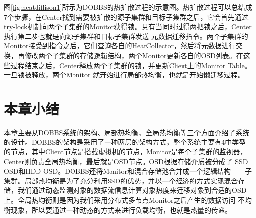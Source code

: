 图\ref{fig:heatdiffison1}所示为DOBBS的热扩散过程的示意图。热扩散过程可以总结成7个步骤，在Center找到需要被扩散的源子集群和目标子集群之后，它会首先通过try-lock机制向两个子集群的Monitor获得锁。只有当同时过得两把锁之后，Center执行第二步也就是向源子集群和目标子集群发送
元数据迁移指令。两个子集群的Monitor接受到指令之后，它们查询各自的HeatCollector，然后将元数据进行交换，再修改两个子集群的存储逻辑结构，两个Monitor更新各自的OSD列表。在这些过程结束之后，Center释放两个子集群的锁，并更新Client上的Monitor Table。一旦锁被释放，两个Monitor
就开始进行局部热均衡，也就是开始懒迁移过程。

\section{本章小结}
本章主要从DOBBS系统的架构、局部热均衡、全局热均衡等三个方面介绍了系统的设计。DOBBS的架构是采用了一种两层的架构方式，整个系统主要有4中类型的节点，其中Client节点是搭载虚拟机的节点，Monitor是每个子集群的监视器，Center则负责全局热均衡，最后就是OSD节点。OSD根据存储介质被分成了
SSD OSD和HDD OSD。DOBBS还将Monitor和混合存储池合并成一个逻辑结构——子集群。局部热均衡是为了充分利用SSD的优势，并以一个经济的方式实现混合存储，我们通过动态监测对象的数据流信息计算对象热度来迁移对象到合适的OSD上。全局热均衡则是因为我们采用分布式多节点Monitor之后产生的数据访问
不均衡现象，所以要通过一种动态的方式来进行负载均衡，也就是热量的传递。